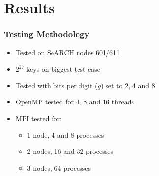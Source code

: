 \section{Results}

\begin{frame}
	\frametitle{Testing Methodology}

\begin{itemize}\itemsep=10pt
		\item Tested on SeARCH nodes 601/611
		\item $2^{27}$ keys on biggest test case
		\item Tested with bits per digit ($g$) set to 2, 4 and 8
		\item OpenMP tested for 4, 8 and 16 threads
		\item MPI tested for:
		\begin{itemize}
			\item 1 node, 4 and 8 processes
			\item 2 nodes, 16 and 32 processes
			\item 3 nodes, 64 processes
		\end{itemize}
	\end{itemize}
\end{frame}
